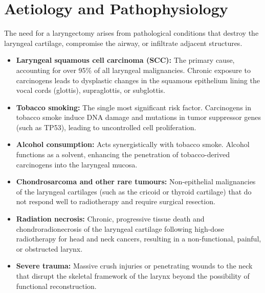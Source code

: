 \section*{Aetiology and Pathophysiology}
The need for a laryngectomy arises from pathological conditions that destroy the laryngeal cartilage, compromise the airway, or infiltrate adjacent structures.
\begin{itemize}
    \item \textbf{Laryngeal squamous cell carcinoma (SCC):} The primary cause, accounting for over 95\% of all laryngeal malignancies. Chronic exposure to carcinogens leads to dysplastic changes in the squamous epithelium lining the vocal cords (glottis), supraglottis, or subglottis.
    \item \textbf{Tobacco smoking:} The single most significant risk factor. Carcinogens in tobacco smoke induce DNA damage and mutations in tumor suppressor genes (such as TP53), leading to uncontrolled cell proliferation.
    \item \textbf{Alcohol consumption:} Acts synergistically with tobacco smoke. Alcohol functions as a solvent, enhancing the penetration of tobacco-derived carcinogens into the laryngeal mucosa.
    \item \textbf{Chondrosarcoma and other rare tumours:} Non-epithelial malignancies of the laryngeal cartilages (such as the cricoid or thyroid cartilage) that do not respond well to radiotherapy and require surgical resection.
    \item \textbf{Radiation necrosis:} Chronic, progressive tissue death and chondroradionecrosis of the laryngeal cartilage following high-dose radiotherapy for head and neck cancers, resulting in a non-functional, painful, or obstructed larynx.
    \item \textbf{Severe trauma:} Massive crush injuries or penetrating wounds to the neck that disrupt the skeletal framework of the larynx beyond the possibility of functional reconstruction.
\end{itemize}


